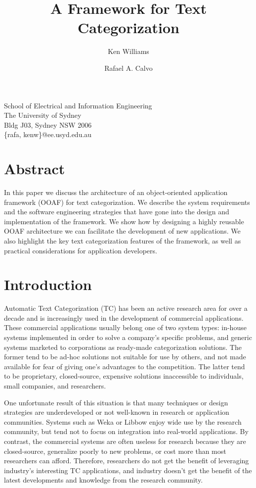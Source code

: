\documentclass[a4paper,twocolumn]{article}
\title{A Framework for Text Categorization}
\author{Ken Williams \and Rafael A. Calvo}
\begin{document}
\maketitle

\begin{center}
School of Electrical and Information Engineering\\
The University of Sydney\\
Bldg J03, Sydney NSW 2006\\
\{rafa, kenw\}@ee.usyd.edu.au
\end{center}

\section*{Abstract}

In this paper we discuss the architecture of an object-oriented
application framework (OOAF) for text categorization. We describe the
system requirements and the software engineering strategies that have
gone into the design and implementation of the framework.  We show how
by designing a highly reusable OOAF architecture we can facilitate the
development of new applications.  We also highlight the key text
categorization features of the framework, as well as practical
considerations for application developers.


\section{Introduction}

Automatic Text Categorization (TC) has been an active research area
for over a decade and is increasingly used in the development of
commercial applications.  These commercial applications usually belong
one of two system types: in-house systems implemented in order to
solve a company's specific problems, and generic systems marketed to
corporations as ready-made categorization solutions.  The former tend
to be ad-hoc solutions not suitable for use by others, and not made
available for fear of giving one's advantages to the competition.  The
latter tend to be proprietary, closed-source, expensive solutions
inaccessible to individuals, small companies, and researchers.

One unfortunate result of this situation is that many techniques or
design strategies are underdeveloped or not well-known in research or
application communities.  Systems such as Weka \cite{weka:99} or
Libbow \cite{bow:96} enjoy wide use by the research community, but
tend not to focus on integration into real-world applications.  By
contrast, the commercial systems are often useless for research
because they are closed-source, generalize poorly to new problems, or
cost more than most researchers can afford.  Therefore, researchers do
not get the benefit of leveraging industry's interesting TC
applications, and industry doesn't get the benefit of the latest
developments and knowledge from the research community.
\end{document}
